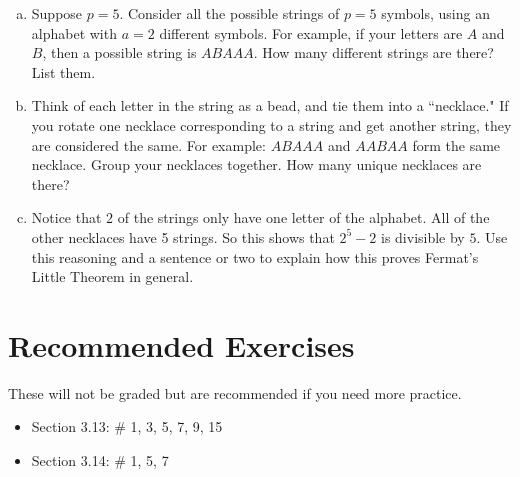 \documentclass[12pt]{amsart}
\theoremstyle{plain}
\theoremstyle{definition}
\begin{document}
\begin{enumerate}[1.]
	\begin{enumerate}[a.]
    	\item Suppose $p = 5$.  Consider all the possible strings of $p = 5$ symbols, using an alphabet with $a = 2$ different symbols. For example, if your letters are $A$ and $B$, then a possible string is $ABAAA$.  How many different strings are there? List them.
        	\begin{framed}
            \vspace{2in}
        	\end{framed}
        \item Think of each letter in the string as a bead, and tie them into a ``necklace."  If you rotate one necklace corresponding to a string and get another string, they are considered the same.  For example: $ABAAA$ and $AABAA$ form the same necklace.  Group your necklaces together.  How many unique necklaces are there?
        	\begin{framed}
            \vspace{1in}
        	\end{framed}
       \item Notice that $2$ of the strings only have one letter of the alphabet.  All of the other necklaces have 5 strings.  So this shows that $2^5 - 2$ is divisible by $5$.  Use this reasoning and a sentence or two to explain how this proves Fermat's Little Theorem in general.
        	\begin{framed}
            \vspace{1in}
        	\end{framed}
	\end{enumerate}
\end{enumerate}

\section{Recommended Exercises}
\noindent These will not be graded but are recommended if you need more practice.
\begin{itemize}
	\item Section 3.13: \# 1, 3, 5, 7, 9, 15
	\item Section 3.14: \# 1, 5, 7
\end{itemize}
	
\end{document}

